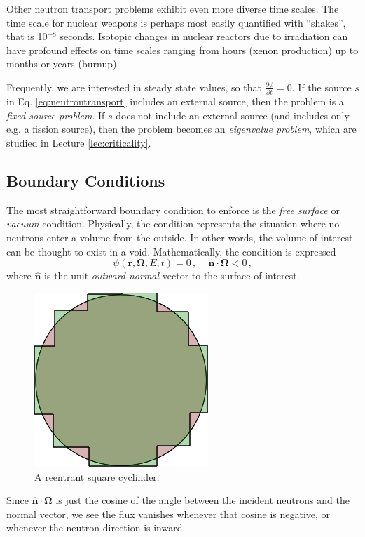 Other neutron transport problems exhibit even more diverse time scales.  The time scale for nuclear weapons is perhaps most easily quantified with ``shakes'', that is 10$^{-8}$ seconds.  Isotopic changes in nuclear reactors due to irradiation can have profound effects on time scales ranging from hours (xenon production) up to months or years (burnup).

Frequently, we are interested in steady state values, so that $\frac{\partial \psi}{\partial t} = 0$.  If the source $s$ in Eq. \ref{eq:neutrontransport} includes an external source, then the problem is a \textit{fixed source problem}.  If $s$ does not include an external source (and includes only e.g. a fission source), then the problem becomes an \textit{eigenvalue problem}, which are studied in Lecture \ref{lec:criticality}.

\subsection*{Boundary Conditions}

The most straightforward boundary condition to enforce is the \textit{free surface} or \textit{vacuum} condition.  Physically, the condition represents the situation where no neutrons enter a volume from the outside.  In other words, the volume of interest can be thought to exist in a void.  Mathematically, the condition is expressed
\begin{equation}
 \psi(\mathbf{r},\mathbf{\Omega},E,t) = 0 \, , \, \, \, \,  \, \, \, \mathbf{\hat{n}} \cdot \mathbf{\Omega} < 0 \, ,
\end{equation}
where $\mathbf{\hat{n}}$ is the unit \textit{outward normal} vector to the surface of interest.  
\begin{figure}
    \begin{center}
    \includegraphics[keepaspectratio, width = 1.25 in]{images/squarecylinder}
    \end{center}
    \caption{A reentrant square cyclinder.}
    \label{fig:squarecylinder}
\end{figure}
Since $\mathbf{\hat{n}} \cdot \mathbf{\Omega}$ is just the cosine of the angle between the incident neutrons and the normal vector, we see the flux vanishes whenever that cosine is negative, or whenever the neutron direction is inward.

